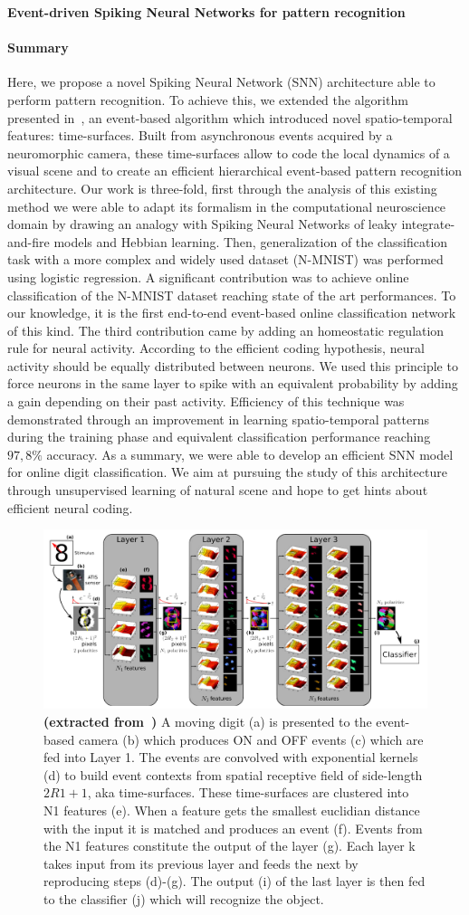 \documentclass[12pt]{article}
\newcommand{\citep}[1]{\parencite{#1}}
\newcommand{\citet}[1]{\textcite{#1}}
\newcommand{\AuthorAG}{Antoine Grimaldi}
\newcommand{\AuthorLP}{Laurent Perrinet}
\newcommand{\AuthorVB}{Victor Boutin}
\newcommand{\AddressLP}{Institut de Neurosciences de la Timone (UMR 7289); Aix Marseille Univ, CNRS; Marseille, France}%
\newcommand{\AuthorSI}{Sio-Hoi Ieng}
\newcommand{\AuthorRB}{Ryad Benosman}%
\newcommand{\AddressRB}{Sorbonne Université, INSERM, CNRS, Institut de la Vision, France;}%
\newcommand{\Summary}{
Here, we propose a novel Spiking Neural Network (SNN) architecture able to perform pattern recognition. %
To achieve this, we extended the algorithm presented in~\citet{Lagorce17}, an event-based algorithm which introduced novel spatio-temporal features: time-surfaces. Built from asynchronous events acquired by a neuromorphic camera, these time-surfaces allow to code the local dynamics of a visual scene and to create an efficient hierarchical event-based pattern recognition architecture. 
Our work is three-fold, first through the analysis of this existing method we were able to adapt its formalism in the computational neuroscience domain by drawing an analogy with Spiking Neural Networks of leaky integrate-and-fire models and Hebbian learning. 
Then, %
generalization of the classification task with a more complex and widely used dataset (N-MNIST) was performed using logistic regression. A significant contribution was to achieve online classification of the N-MNIST dataset reaching state of the art performances. To our knowledge, it is the first end-to-end event-based online classification network of this kind. The third contribution came by adding an homeostatic regulation rule for neural activity. According to the efficient coding hypothesis, neural activity should be equally distributed between neurons. We used this principle to force neurons in the same layer to spike with an equivalent probability by adding a gain depending on their past activity. Efficiency of this technique was demonstrated through an improvement in learning spatio-temporal patterns during the training phase and equivalent classification performance reaching $97,8\%$ accuracy. As a summary, %
we were able to develop an efficient SNN model for online digit classification. We aim at pursuing the study of this architecture through unsupervised learning of natural scene and hope to get hints about efficient neural coding.
}
\begin{document}
{\Large\bf
Event-driven Spiking Neural Networks %
for
pattern recognition
}

%


\parindent 12pt

\paragraph*{Summary}
\Summary
%
\begin{figure}
\includegraphics[width=.99\linewidth]{../notebooks/fig/hots.png}
\caption
{
\textbf{(extracted from~\citep{Lagorce17}) } A moving digit (a) is presented to the event-based camera (b) which produces ON and OFF events (c) which are fed into Layer 1. The events are convolved with exponential kernels (d) to build event contexts from spatial receptive field of side-length $2R1+1$, aka time-surfaces. These time-surfaces are clustered into N1 features (e). When a feature gets the smallest euclidian distance with the input it is matched and produces an event (f). Events from the N1 features constitute the output of the layer (g). Each layer k takes input from its previous layer and feeds the next by reproducing steps (d)-(g). The output (i) of the last layer is then fed to the classifier (j) which will recognize the object.
\label{fig:fig1}
}
\end{figure}
\end{document}
